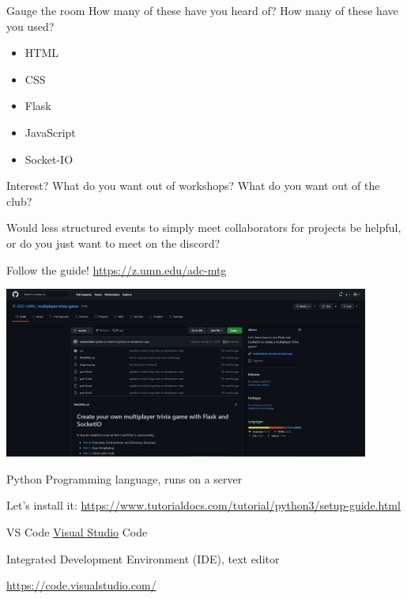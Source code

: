 \documentclass{beamer}
\begin{document}
\begin{frame}{Gauge the room}
	How many of these have you heard of? How many of these have you used?

	\begin{itemize}
		\item HTML
		\item CSS
		\item Flask
		\item JavaScript
		\item Socket-IO
	\end{itemize}
\end{frame}

\begin{frame}{Interest?}
	What do you want out of workshops? What do you want out of the club?

	\bigskip

	Would less structured events to simply meet collaborators for projects
	be helpful, or do you just want to meet on the discord?
\end{frame}

\begin{frame}{Follow the guide!}
	\centering
	\href{https://z.umn.edu/adc-mtg}{https://z.umn.edu/adc-mtg}

	\bigskip

	\includegraphics[width=0.9\textwidth]{figs/guide.png}
\end{frame}

\begin{frame}{Python}
	Programming language, runs on a server

	\bigskip

	Let's install it: \href{https://www.tutorialdocs.com/tutorial/python3/setup-guide.html}{https://www.tutorialdocs.com/tutorial/python3/setup-guide.html}
\end{frame}

\begin{frame}{VS Code}
	\underline{Visual Studio} Code

	\bigskip

	Integrated Development Environment (IDE), text editor

	\bigskip

	\href{https://code.visualstudio.com/}{https://code.visualstudio.com/}
\end{frame}
\end{document}
